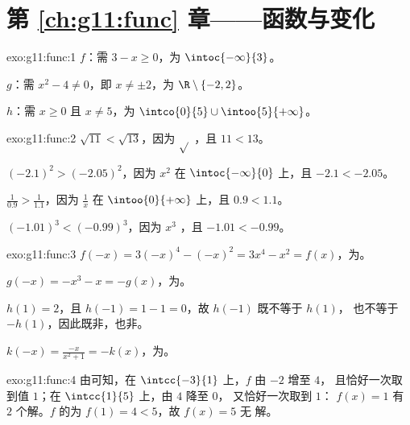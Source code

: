 \section*{第 \ref{ch:g11:func} 章——函数与变化}

\begin{solution}{exo:g11:func:1}
$f$：需 $3 - x \geq 0$，为 $\intoc{-\infty}{3}$。

$g$：需 $x^2 - 4 \neq 0$，即 $x \neq \pm 2$，为
$\R \setminus \{-2, 2\}$。

$h$：需 $x \geq 0$ 且 $x \neq 5$，为
$\intco{0}{5} \cup \intoo{5}{+\infty}$。
\end{solution}

\begin{solution}{exo:g11:func:2}
$\sqrt{11} < \sqrt{13}$，因为 $\sqrt{}$ ，且 $11 < 13$。

$(-2.1)^2 > (-2.05)^2$，因为 $x^2$ 在
$\intoc{-\infty}{0}$ 上，且 $-2.1 < -2.05$。

$\frac{1}{0.9} > \frac{1}{1.1}$，因为 $\frac1x$ 在
$\intoo{0}{+\infty}$ 上，且 $0.9 < 1.1$。

$(-1.01)^3 < (-0.99)^3$，因为 $x^3$ ，且 $-1.01 < -0.99$。
\end{solution}

\begin{solution}{exo:g11:func:3}
$f(-x) = 3(-x)^4 - (-x)^2 = 3x^4 - x^2 = f(x)$，为。

$g(-x) = -x^3 - x = -g(x)$，为。

$h(1) = 2$，且 $h(-1) = 1 - 1 = 0$，故 $h(-1)$ 既不等于 $h(1)$，
也不等于 $-h(1)$，因此既非，也非。

$k(-x) = \frac{-x}{x^2+1} = -k(x)$，为。
\end{solution}

\begin{solution}{exo:g11:func:4}
由可知，在 $\intcc{-3}{1}$ 上，$f$ 由 $-2$ 增至 $4$，
且恰好一次取到值 $1$；在 $\intcc{1}{5}$ 上，由 $4$ 降至 $0$，
又恰好一次取到 $1$： $f(x) = 1$ 有
$2$ 个解。$f$ 的为 $f(1) = 4 < 5$，故 $f(x) = 5$ 无
解。
\end{solution}

